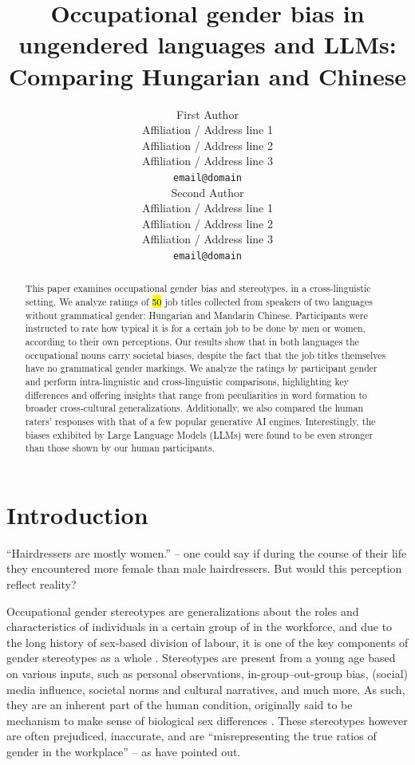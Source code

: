 \documentclass[11pt]{article}
\title{Occupational gender bias in ungendered languages and LLMs: Comparing Hungarian and Chinese}
\author{First Author \\
  Affiliation / Address line 1 \\
  Affiliation / Address line 2 \\
  Affiliation / Address line 3 \\
  \texttt{email@domain} \\\And
  Second Author \\
  Affiliation / Address line 1 \\
  Affiliation / Address line 2 \\
  Affiliation / Address line 3 \\
  \texttt{email@domain} \\}
\begin{document}
\maketitle

\begin{abstract}
This paper examines occupational gender bias and stereotypes, in a cross-linguistic setting. We analyze ratings of \hl{50} job titles collected from speakers of two languages without grammatical gender: Hungarian and Mandarin Chinese. Participants were instructed to rate how typical it is for a certain job to be done by men or women, according to their own perceptions. 
Our results show that in both languages the occupational nouns carry societal biases, despite the fact that the job titles themselves have no grammatical gender markings. We analyze the ratings by participant gender and perform intra-linguistic and cross-linguistic comparisons, highlighting key differences and offering insights that range from peculiarities in word formation to broader cross-cultural generalizations. 
Additionally, we also compared the human raters' responses with that of a few popular generative AI engines. Interestingly, the biases exhibited by Large Language Models (LLMs) were found to be even stronger than those shown by our human participants.

\end{abstract}

\section{Introduction}

``Hairdressers are mostly women.'' -- one could say if during the course of their life they encountered more female than male hairdressers. But would this perception reflect reality?

Occupational gender stereotypes are generalizations about the roles and characteristics of individuals in a certain group of in the workforce, and due to the long history of sex-based division of labour, it is one of the key components of gender stereotypes as a whole \citep{deaux_1984_structure}. Stereotypes are present from a young age \citep{canessapollard_2022_development} based on various inputs, such as personal observations, in-group--out-group bias, (social) media influence, societal norms and cultural narratives, and much more. As such, they are an inherent part of the human condition, originally said to be mechanism to make sense of biological sex differences \citep{levanon_2016_persistence}. These stereotypes however are often prejudiced, inaccurate, and are ``misrepresenting the true ratios of gender in the workplace'' \citep{garnham_2015_true,gygax_2016_what} -- as \citet{kaukonen_2025_gender} have pointed out.
\end{document}

